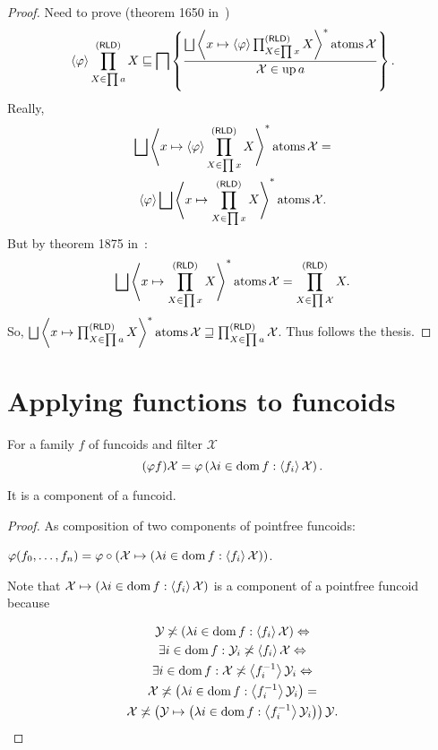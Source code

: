 \begin{proof}
  Need to prove (theorem 1650 in~\cite{volume-1-edition1})
  \[ \supfun{\varphi} \prod^{\reloids}_{X \in \prod a} X \sqsubseteq \bigsqcap
     \setcond{\bigsqcup \rsupfun{x \mapsto \supfun{\varphi}
     \prod^{\reloids}_{X \in \prod x} X} \atoms \mathcal{X}}{\mathcal{X} \in
     \up a} . \]
  Really,
\begin{multline*}
\bigsqcup \rsupfun{x \mapsto \supfun{\varphi} \prod^{\reloids}_{X \in
     \prod x} X} \atoms \mathcal{X} =\\ \supfun{\varphi} \bigsqcup \rsupfun{x
     \mapsto \prod^{\reloids}_{X \in \prod x} X} \atoms \mathcal{X} .
\end{multline*}
  But by theorem 1875 in~\cite{volume-1-edition1}:
  \[ \bigsqcup \rsupfun{x \mapsto \prod^{\reloids}_{X \in \prod x} X}
     \atoms \mathcal{X} = \prod^{\reloids}_{X \in \prod \mathcal{X}}
     X . \]
  So, $\bigsqcup \rsupfun{x \mapsto \prod^{\reloids}_{X \in \prod a} X}
  \atoms \mathcal{X} \sqsupseteq \prod^{\reloids}_{X \in \prod a}
  \mathcal{X}$. Thus follows the thesis.
\end{proof}

\section{Applying functions to funcoids}

\begin{defn}
For a family $f$ of funcoids and filter
  $\mathcal{X}$
\[(\varphi f) \mathcal{X} = \varphi \left( \lambda i \in \operatorname{dom} f :
  \left\langle f_i\right\rangle \mathcal{X} \right) .\]
\end{defn}

\begin{prop}
  It is a component of a funcoid.
\end{prop}

\begin{proof}
  As composition of two components of pointfree funcoids:
  
  $\varphi (f_0, \ldots, f_n) = \varphi \circ \left( \mathcal{X} \mapsto
  \left( \lambda i \in \operatorname{dom} f : \left\langle f_i\right\rangle \mathcal{X} \right)
  \right)$.
  
  Note that $\mathcal{X} \mapsto \left( \lambda i \in \operatorname{dom} f :
  \left\langle f_i\right\rangle \mathcal{X} \right)$ is a component of a pointfree funcoid because
  
\begin{multline*}
  \mathcal{Y} \not\asymp \left( \lambda i \in \operatorname{dom} f : \left\langle f_i\right\rangle
  \mathcal{X} \right) \Leftrightarrow\\ \exists i \in \operatorname{dom} f :
  \mathcal{Y}_i \not\asymp \left\langle f_i\right\rangle \mathcal{X} \Leftrightarrow\\ \exists i \in
  \operatorname{dom} f : \mathcal{X} \not\asymp \left\langle f_i^{- 1}\right\rangle \mathcal{Y}_i
  \Leftrightarrow\\ \mathcal{X} \not\asymp \left( \lambda i \in \operatorname{dom} f :
  \left\langle f_i^{- 1}\right\rangle \mathcal{Y}_i \right) =\\ \mathcal{X} \not\asymp \left(
  \mathcal{Y} \mapsto \left( \lambda i \in \operatorname{dom} f : \left\langle f_i^{- 1}\right\rangle
  \mathcal{Y}_i \right) \right) \mathcal{Y}.
\end{multline*}
\end{proof}


